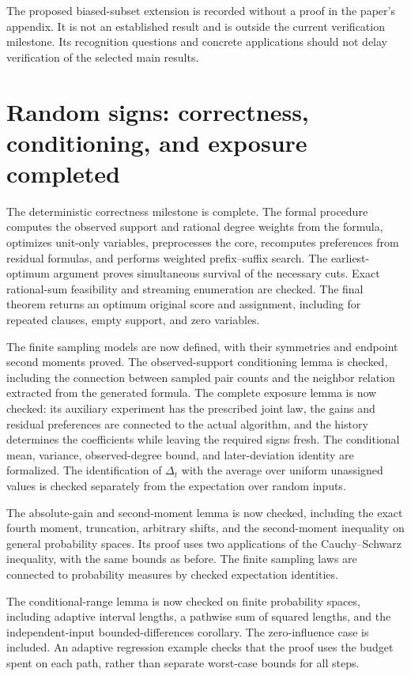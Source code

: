 \documentclass[11pt,a4paper]{article}
\begin{document}
The proposed biased-subset extension is recorded without a proof in the
paper's appendix. It is not an established result and is outside the
current verification milestone. Its recognition questions and concrete
applications should not delay verification of the selected main results.

\section{Random signs: correctness, conditioning, and exposure completed}

The deterministic correctness milestone is complete. The formal procedure
computes the observed support and rational degree weights from the formula,
optimizes unit-only variables, preprocesses the core, recomputes preferences
from residual formulas, and performs weighted prefix--suffix search.
The earliest-optimum argument proves simultaneous survival of the necessary
cuts. Exact rational-sum feasibility and streaming enumeration are checked.
The final theorem returns an optimum original score and assignment, including
for repeated clauses, empty support, and zero variables.

The finite sampling models are now defined, with their symmetries and
endpoint second moments proved. The observed-support conditioning lemma
is checked, including the connection between sampled pair counts and the
neighbor relation extracted from the generated formula. The complete
exposure lemma is now checked: its auxiliary experiment has the prescribed
joint law, the gains and residual preferences are connected to the actual
algorithm, and the history determines the coefficients while leaving the
required signs fresh. The conditional mean, variance, observed-degree
bound, and later-deviation identity are formalized. The identification of
$\Delta_t$ with the average over uniform unassigned values is checked
separately from the expectation over random inputs.

The absolute-gain and second-moment lemma is now checked, including
the exact fourth moment, truncation, arbitrary shifts, and the
second-moment inequality on general probability spaces. Its proof uses
two applications of the Cauchy--Schwarz inequality, with the same bounds
as before. The finite sampling laws are connected to probability
measures by checked expectation identities.

The conditional-range lemma is now checked on finite probability spaces,
including adaptive interval lengths, a pathwise sum of squared lengths,
and the independent-input bounded-differences corollary. The zero-influence
case is included. An adaptive regression example checks that the proof
uses the budget spent on each path, rather than separate worst-case
bounds for all steps.
\end{document}
